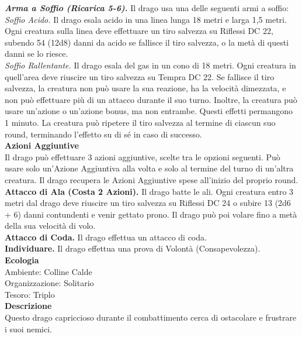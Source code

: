 \begin{multicols}{2}
\emph{\textbf{Arma a Soffio (Ricarica 5-6).}} Il drago usa una delle seguenti armi a soffio:\\
\emph{Soffio Acido.} Il drago esala acido in una linea lunga 18 metri e larga 1,5 metri. Ogni creatura sulla linea deve effettuare un tiro salvezza su Riflessi DC  22, subendo 54 (12d8) danni da acido se fallisce il tiro salvezza, o la metà di questi danni se lo riesce.\\
\emph{Soffio Rallentante.} Il drago esala del gas in un cono di 18 metri. Ogni creatura in quell'area deve riuscire un tiro salvezza su Tempra DC  22. Se fallisce il tiro salvezza, la creatura non può usare la sua reazione, ha la velocità dimezzata, e non può effettuare più di un attacco durante il suo turno. Inoltre, la creatura può usare un'azione o un'azione bonus, ma non entrambe. Questi effetti permangono 1 minuto. La creatura può ripetere il tiro salvezza al termine di ciascun suo round, terminando l'effetto su di sé in caso di successo.\\
\textbf{Azioni Aggiuntive}\\
Il drago può effettuare 3 azioni aggiuntive, scelte tra le opzioni seguenti. Può usare solo un'Azione Aggiuntiva alla volta e solo al termine del turno di un'altra creatura. Il drago recupera le Azioni Aggiuntive spese all'inizio del proprio round.\\
\textbf{Attacco di Ala (Costa 2 Azioni).} Il drago batte le ali. Ogni creatura entro 3 metri dal drago deve riuscire un tiro salvezza su Riflessi DC  24 o subire 13 (2d6 + 6) danni contundenti e venir gettato prono. Il drago può poi volare fino a metà della sua velocità di volo.\\
\textbf{Attacco di Coda.} Il drago effettua un attacco di coda.\\
\textbf{Individuare.} Il drago effettua una prova di Volontà (Consapevolezza).\\
\textbf{Ecologia}\\
Ambiente: Colline Calde\\
Organizzazione: Solitario\\
Tesoro: Triplo\\
\textbf{Descrizione}\\
Questo drago capriccioso durante il combattimento cerca di ostacolare e frustrare i suoi nemici.\\



\end{multicols}
